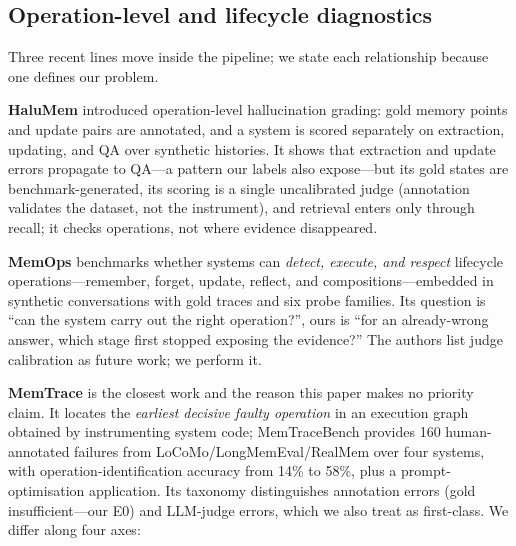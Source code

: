 \documentclass[11pt]{article}
\begin{document}
\subsection{Operation-level and lifecycle diagnostics}

Three recent lines move inside the pipeline; we state each relationship
because one defines our problem.

\textbf{HaluMem} \citep{chen2025halumem} introduced operation-level
hallucination grading: gold memory points and update pairs are annotated, and
a system is scored separately on extraction, updating, and QA over synthetic
histories. It shows that extraction and update errors propagate to QA---a
pattern our labels also expose---but its gold states are benchmark-generated,
its scoring is a single uncalibrated judge (annotation validates the dataset,
not the instrument), and retrieval enters only through recall; it checks
operations, not where evidence disappeared.

\textbf{MemOps} \citep{hao2026memops} benchmarks whether systems can
\emph{detect, execute, and respect} lifecycle operations---remember, forget,
update, reflect, and compositions---embedded in synthetic conversations with
gold traces and six probe families. Its question is ``can the system carry out
the right operation?'', ours is ``for an already-wrong answer, which stage
first stopped exposing the evidence?'' The authors list judge calibration as
future work; we perform it.

\textbf{MemTrace} \citep{deng2026memtrace} is the closest work and the reason
this paper makes no priority claim. It locates the \emph{earliest decisive
faulty operation} in an execution graph obtained by instrumenting system
code; MemTraceBench provides 160 human-annotated failures from
LoCoMo/LongMemEval/RealMem over four systems, with operation-identification
accuracy from 14\% to 58\%, plus a prompt-optimisation application. Its
taxonomy distinguishes annotation errors (gold insufficient---our E0) and
LLM-judge errors, which we also treat as first-class. We differ along four
axes:
\end{document}
